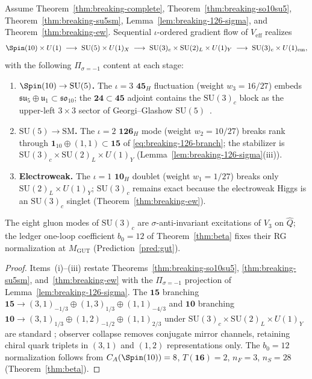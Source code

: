 \begin{theorem}
\label{thm:qcd-derived}
Assume Theorem~\ref{thm:breaking-complete},
Theorem~\ref{thm:breaking-so10su5}, Theorem~\ref{thm:breaking-su5sm},
Lemma~\ref{lem:breaking-126-sigma}, and Theorem~\ref{thm:breaking-ew}.
Sequential $\iota$-ordered gradient flow of $V_{\mathrm{eff}}$ realizes
\begin{equation}\label{eq:qcd-breaking-chain}
  \Spin(10)\times U(1)
  \;\longrightarrow\;
  \mathrm{SU}(5)\times U(1)_X
  \;\longrightarrow\;
  \mathrm{SU}(3)_c\times\mathrm{SU}(2)_L\times U(1)_Y
  \;\longrightarrow\;
  \mathrm{SU}(3)_c\times U(1)_{\mathrm{em}},
\end{equation}
with the following $\Pi_{\sigma=-1}$ content at each stage:
\begin{enumerate}[label=(\roman*),leftmargin=*]
  \item \textbf{$\Spin(10)\to\mathrm{SU}(5)$.} The $\iota=3$
    $\mathbf{45}_H$ fluctuation (weight $w_3=16/27$) embeds
    $\mathfrak{su}_5\oplus\mathfrak{u}_1\subset\mathfrak{so}_{10}$; the
    $\mathbf{24}\subset\mathbf{45}$ adjoint contains the $\mathrm{SU}(3)_c$
    block as the upper-left $3\times3$ sector of Georgi--Glashow
    $\mathrm{SU}(5)$~\cite{GeorgiGlashow1974}.
  \item \textbf{$\mathrm{SU}(5)\to\mathrm{SM}$.} The $\iota=2$
    $\mathbf{126}_H$ mode (weight $w_2=10/27$) breaks rank through
    $\mathbf{1}_{10}\oplus(1,1)\subset\mathbf{15}$ of
    \eqref{eq:breaking-126-branch}; the stabilizer is
    $\mathrm{SU}(3)_c\times\mathrm{SU}(2)_L\times U(1)_Y$
    (Lemma~\ref{lem:breaking-126-sigma}(iii)).
  \item \textbf{Electroweak.} The $\iota=1$ $\mathbf{10}_H$ doublet
    (weight $w_1=1/27$) breaks only $\mathrm{SU}(2)_L\times U(1)_Y$;
    $\mathrm{SU}(3)_c$ remains exact because the electroweak Higgs is an
    $\mathrm{SU}(3)_c$ singlet (Theorem~\ref{thm:breaking-ew}).
\end{enumerate}
The eight gluon modes of $\mathrm{SU}(3)_c$ are $\sigma$-anti-invariant
excitations of $V_3$ on $\hat Q$; the ledger one-loop coefficient
$b_0=12$ of Theorem~\ref{thm:beta} fixes their RG normalization at
$M_{\mathrm{GUT}}$ (Prediction~\ref{pred:gut}).
\end{theorem}

\begin{proof}
Items~(i)--(iii) restate Theorems~\ref{thm:breaking-so10su5},
\ref{thm:breaking-su5sm}, and~\ref{thm:breaking-ew} with the
$\Pi_{\sigma=-1}$ projection of Lemma~\ref{lem:breaking-126-sigma}. The
$\mathbf{15}$ branching
$\mathbf{15}\to(3,1)_{-1/3}\oplus(1,3)_{1/3}\oplus(1,1)_{-4/3}$ and
$\mathbf{10}$ branching
$\mathbf{10}\to(3,1)_{1/3}\oplus(1,2)_{-1/2}\oplus(1,1)_{2/3}$ under
$\mathrm{SU}(3)_c\times\mathrm{SU}(2)_L\times U(1)_Y$ are standard
\cite{GeorgiGlashow1974,Witten1985}; observer collapse removes conjugate
mirror channels, retaining chiral quark triplets in $(3,1)$ and $(1,2)$
representations only. The $b_0=12$ normalization follows from
$C_A(\Spin(10))=8$, $T(\mathbf{16})=2$, $n_F=3$, $n_S=28$
(Theorem~\ref{thm:beta}).
\end{proof}

